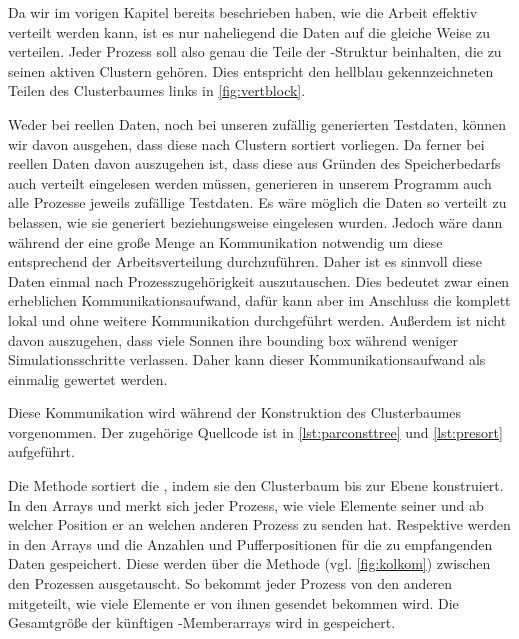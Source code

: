     Da wir im vorigen Kapitel bereits beschrieben haben, wie die Arbeit effektiv verteilt werden kann, ist es nur naheliegend die Daten auf die gleiche Weise zu verteilen. Jeder Prozess soll also 
    genau die Teile der -Struktur beinhalten, die zu seinen aktiven Clustern gehören. Dies entspricht den hellblau gekennzeichneten Teilen des Clusterbaumes links in \autoref{fig:vertblock}.
    
    Weder bei reellen Daten, noch bei unseren zufällig generierten Testdaten, können wir davon ausgehen, dass diese nach Clustern sortiert vorliegen. Da ferner bei reellen Daten davon auszugehen
    ist, dass diese aus Gründen des Speicherbedarfs auch verteilt eingelesen werden müssen, generieren in unserem Programm auch alle Prozesse jeweils zufällige Testdaten. Es wäre möglich die Daten 
    so verteilt zu belassen, wie sie generiert beziehungsweise eingelesen wurden. Jedoch wäre dann während der \vorruck eine große Menge an Kommunikation notwendig um diese entsprechend der 
    Arbeitsverteilung durchzuführen. Daher ist es sinnvoll diese Daten einmal nach Prozesszugehörigkeit auszutauschen. Dies bedeutet zwar einen erheblichen Kommunikationsaufwand, dafür kann aber im
    Anschluss die \vorruck komplett lokal und ohne weitere Kommunikation durchgeführt werden. Außerdem ist nicht davon auszugehen, dass viele Sonnen ihre bounding box während weniger Simulationsschritte
    verlassen. Daher kann dieser Kommunikationsaufwand als einmalig gewertet werden.
    
    Diese Kommunikation wird während der Konstruktion des Clusterbaumes vorgenommen. Der zugehörige Quellcode ist in \autoref{lst:parconsttree} und \autoref{lst:presort} aufgeführt.
    
    Die Methode  sortiert die , indem sie den Clusterbaum bis zur Ebene  konstruiert. In den Arrays  und 
    merkt sich jeder Prozess, wie viele Elemente seiner  und ab welcher Position er an welchen anderen Prozess zu senden hat. Respektive werden in den Arrays  
    und  die Anzahlen und Pufferpositionen für die zu empfangenden Daten gespeichert. Diese werden über die Methode  (vgl. \autoref{fig:kolkom}) zwischen 
    den Prozessen ausgetauscht. So bekommt jeder Prozess von den anderen mitgeteilt, wie viele Elemente er von ihnen gesendet bekommen wird. Die Gesamtgröße der künftigen -Memberarrays
    wird in  gespeichert.
    
